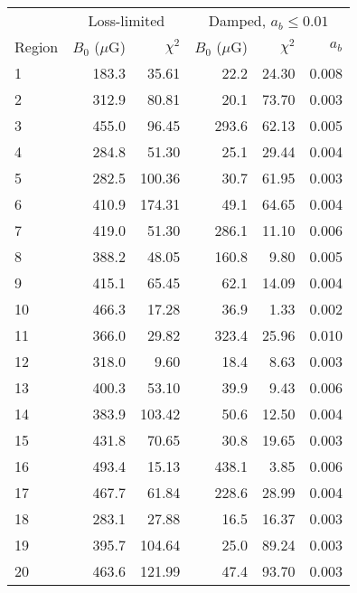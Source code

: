 \begin{tabular}{@{} l rr rrr @{}}
\toprule
{} & \multicolumn{2}{c}{Loss-limited}
   & \multicolumn{3}{c}{Damped, $a_b \leq 0.01$} \\
\cmidrule(lr){2-3} \cmidrule(l){4-6}
Region & $B_0$ ($\mu$G) & $\chi^2$
       & $B_0$ ($\mu$G) & $\chi^2$ & $a_b$ \\
\midrule
1 & 183.3 & 35.61 & 22.2 & 24.30 & 0.008 \\
2 & 312.9 & 80.81 & 20.1 & 73.70 & 0.003 \\
3 & 455.0 & 96.45 & 293.6 & 62.13 & 0.005 \\
\cmidrule{1-6}
4 & 284.8 & 51.30 & 25.1 & 29.44 & 0.004 \\
5 & 282.5 & 100.36 & 30.7 & 61.95 & 0.003 \\
6 & 410.9 & 174.31 & 49.1 & 64.65 & 0.004 \\
7 & 419.0 & 51.30 & 286.1 & 11.10 & 0.006 \\
8 & 388.2 & 48.05 & 160.8 & 9.80 & 0.005 \\
9 & 415.1 & 65.45 & 62.1 & 14.09 & 0.004 \\
10 & 466.3 & 17.28 & 36.9 & 1.33 & 0.002 \\
\cmidrule{1-6}
11 & 366.0 & 29.82 & 323.4 & 25.96 & 0.010 \\
12 & 318.0 & 9.60 & 18.4 & 8.63 & 0.003 \\
13 & 400.3 & 53.10 & 39.9 & 9.43 & 0.006 \\
\cmidrule{1-6}
14 & 383.9 & 103.42 & 50.6 & 12.50 & 0.004 \\
15 & 431.8 & 70.65 & 30.8 & 19.65 & 0.003 \\
16 & 493.4 & 15.13 & 438.1 & 3.85 & 0.006 \\
17 & 467.7 & 61.84 & 228.6 & 28.99 & 0.004 \\
\cmidrule{1-6}
18 & 283.1 & 27.88 & 16.5 & 16.37 & 0.003 \\
19 & 395.7 & 104.64 & 25.0 & 89.24 & 0.003 \\
20 & 463.6 & 121.99 & 47.4 & 93.70 & 0.003 \\
\bottomrule
\end{tabular}


